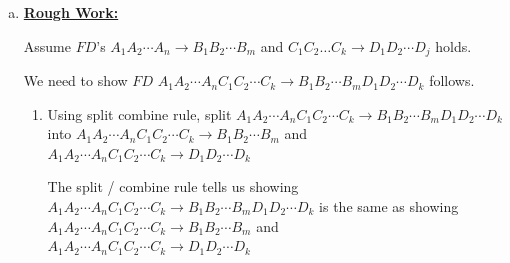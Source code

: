 \documentclass[12pt]{article}
\begin{document}
\begin{enumerate}[1.]
\begin{enumerate}[a)]







            \item

            \bigskip

            \underline{\textbf{Rough Work:}}

            \bigskip

            Assume $FD$'s $A_1A_2 \cdots A_n \to B_1 B_2 \cdots B_m$ and $C_1 C_2 \dots C_k \to D_1 D_2 \cdots D_j$ holds.

            \bigskip

            We need to show $FD$ $A_1A_2 \cdots A_n C_1 C_2 \cdots C_k \to B_1 B_2 \cdots B_m D_1 D_2 \cdots D_k$ follows.

            \bigskip

            \begin{enumerate}[1.]
                \item Using split combine rule, split $A_1A_2 \cdots A_n C_1 C_2 \cdots C_k \to B_1 B_2 \cdots B_m D_1 D_2 \cdots D_k$
                into $A_1A_2 \cdots A_n C_1 C_2 \cdots C_k \to B_1 B_2 \cdots B_m$ and  $A_1A_2 \cdots A_n C_1 C_2 \cdots C_k \to D_1 D_2 \cdots D_k$

                \bigskip

                \begin{mdframed}
                The split / combine rule tells us showing $A_1A_2 \cdots A_n C_1 C_2 \cdots C_k \to B_1 B_2 \cdots B_m D_1 D_2 \cdots D_k$ is
                the same as showing $A_1A_2 \cdots A_n C_1 C_2 \cdots C_k \to B_1 B_2 \cdots B_m$ and
                \\ $A_1A_2 \cdots A_n C_1 C_2 \cdots C_k \to D_1 D_2 \cdots D_k$


\end{mdframed}
\end{enumerate}
\end{enumerate}
\end{enumerate}
\end{document}
